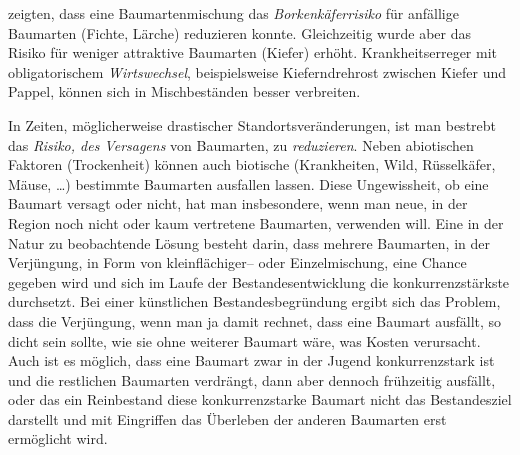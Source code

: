 \documentclass[twocolumn]{scrartcl}
\begin{document}
\cite{sylvie2021mischwaldInsekten} zeigten, dass eine
Baumartenmischung das \emph{Borkenkäferrisiko} für anfällige Baumarten
(Fichte, Lärche) reduzieren konnte. Gleichzeitig wurde aber das Risiko
für weniger attraktive Baumarten (Kiefer) erhöht. Krankheitserreger
mit obligatorischem \emph{Wirtswechsel}, beispielsweise
Kieferndrehrost zwischen Kiefer und Pappel, können sich in
Mischbeständen besser verbreiten.

In Zeiten, möglicherweise drastischer Standortsveränderungen, ist man bestrebt
das \emph{Risiko, des Versagens} von Baumarten, zu \emph{reduzieren}. Neben
abiotischen Faktoren (Trockenheit) können auch biotische (Krankheiten, Wild,
Rüsselkäfer, Mäuse, \dots) bestimmte Baumarten ausfallen lassen. Diese
Ungewissheit, ob eine Baumart versagt oder nicht, hat man insbesondere, wenn man
neue, in der Region noch nicht oder kaum vertretene Baumarten, verwenden will.
Eine in der Natur zu beobachtende Lösung besteht darin, dass mehrere Baumarten,
in der Verjüngung, in Form von kleinflächiger-- oder Einzelmischung, eine Chance
gegeben wird und sich im Laufe der Bestandesentwicklung die konkurrenzstärkste
durchsetzt. Bei einer künstlichen Bestandesbegründung ergibt sich das Problem,
dass die Verjüngung, wenn man ja damit rechnet, dass eine Baumart ausfällt, so
dicht sein sollte, wie sie ohne weiterer Baumart wäre, was Kosten verursacht.
Auch ist es möglich, dass eine Baumart zwar in der Jugend konkurrenzstark ist
und die restlichen Baumarten verdrängt, dann aber dennoch frühzeitig ausfällt,
oder das ein Reinbestand diese konkurrenzstarke Baumart nicht das Bestandesziel
darstellt und mit Eingriffen das Überleben der anderen Baumarten erst ermöglicht
wird.
\end{document}
